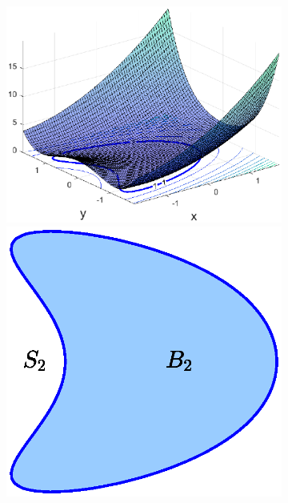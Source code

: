 \documentclass[11pt]{article}
\newenvironment{example}
  {\pushQED{\qed}\renewcommand{\qedsymbol}{$\triangle$}\examplex}
  {\popQED\endexamplex}
\theoremstyle{remark}
\begin{document}
\begin{example}
\begin{figure}[!htb]
\begin{subfigure}{0.5\textwidth}
    \end{subfigure}%
    \hspace{-20pt}
    \begin{subfigure}{0.5\textwidth}
    \centering
    \includegraphics[scale=0.6]{Fig1c.eps}
    \vspace{-10pt}
    \includegraphics[scale=0.6]{Fig1d.eps}

\end{subfigure}
\end{figure}
\end{example}
\end{document}
